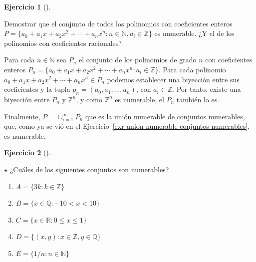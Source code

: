\documentclass[
  a4paper,
]{scrreport}
\providecommand{\tightlist}{%
  \setlength{\itemsep}{0pt}\setlength{\parskip}{0pt}}\usepackage{longtable,booktabs,array}
\theoremstyle{definition}
\newtheorem{exercise}{Ejercicio}[chapter]
\theoremstyle{remark}
\begin{document}
\leavevmode{}%
\begin{exercise}[]\label{exr-conjunto-polinomios-no-numerable}

Demostrar que el conjunto de todos los polinomios con coeficientes
enteros
\(P=\{a_0+a_1x+a_2x^2+\cdots+a_nx^n: n\in \mathbb{N}, a_i\in \mathbb{Z}\}\)
es numerable. ¿Y el de los polinomios con coeficientes racionales?

\end{exercise}

\begin{tcolorbox}[enhanced jigsaw, colbacktitle=quarto-callout-tip-color!10!white, coltitle=black, arc=.35mm, opacityback=0, breakable, colback=white, bottomtitle=1mm, opacitybacktitle=0.6, rightrule=.15mm, colframe=quarto-callout-tip-color-frame, title=\textcolor{quarto-callout-tip-color}{\faLightbulb}\hspace{0.5em}{Solución}, toptitle=1mm, titlerule=0mm, bottomrule=.15mm, left=2mm, leftrule=.75mm, toprule=.15mm]

Para cada \(n\in\mathbb{N}\) sea \(P_n\) el conjunto de los polinomios
de grado \(n\) con coeficientes enteros
\(P_n=\{a_0+a_1x+a_2x^2+\cdots+a_nx^n: a_i\in \mathbb{Z}\}\). Para cada
polinomio \(a_0+a_1x+a_2x^2+\cdots+a_nx^n\in P_n\) podemos establecer
una biyección entre sus coeficientes y la tupla
\(p_n=(a_0,a_1,\ldots,a_n)\), con \(a_i\in\mathbb{Z}\). Por tanto,
existe una biyección entre \(P_n\) y \(\mathbb{Z}^n\), y como
\(\mathbb{Z}^n\) es numerable, el \(P_n\) también lo es.

Finalmente, \(P=\cup_{i=1}^\infty P_n\) que es la unión numerable de
conjuntos numerables, que, como ya se vió en el
Ejercicio~\ref{exr-union-numerable-conjuntos-numerables}, es numerable.

\end{tcolorbox}

\leavevmode{}%
\begin{exercise}[]\label{exr-conjuntos-numerables}

\(\star\) ¿Cuáles de los siguientes conjuntos son numerables?

\begin{enumerate}
\def\labelenumi{\alph{enumi}.}
\tightlist
\item
  \(A=\{3k: k\in \mathbb{Z}\}\)
\item
  \(B=\{x\in \mathbb{Q}: -10 < x < 10\}\)
\item
  \(C = \{x\in \mathbb{R}: 0\leq x\leq 1\}\)
\item
  \(D=\{(x,y): x\in \mathbb{Z}, y\in \mathbb{Q}\}\)
\item
  \(E=\{1/n : n\in \mathbb{N}\}\)
\end{enumerate}

\end{exercise}
\end{document}
